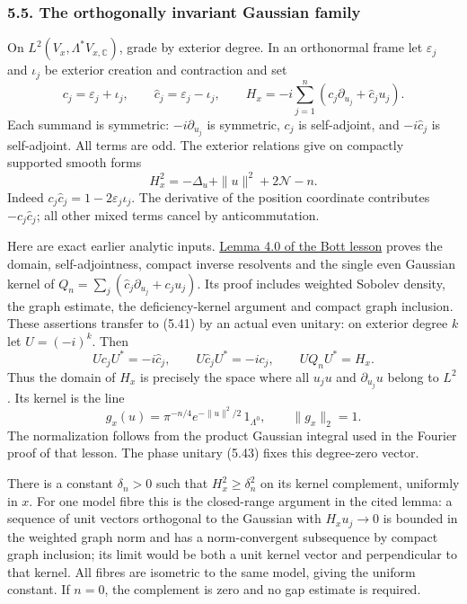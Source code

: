 \documentclass[
  11pt,
]{article}
\begin{document}
\subsubsection{5.5. The orthogonally invariant Gaussian
family}\label{the-orthogonally-invariant-gaussian-family}

On \(L^2(V_x,\Lambda^*V_{x,\mathbb C})\), grade by exterior degree. In
an orthonormal frame let \(\varepsilon_j\) and \(\iota_j\) be exterior
creation and contraction and set \[
c_j=\varepsilon_j+\iota_j,\qquad
\widehat c_j=\varepsilon_j-\iota_j,
\qquad
H_x=-i\sum_{j=1}^n(c_j\partial_{u_j}+\widehat c_j u_j).
\tag{5.41}
\] Each summand is symmetric: \(-i\partial_{u_j}\) is symmetric, \(c_j\)
is self-adjoint, and \(-i\widehat c_j\) is self-adjoint. All terms are
odd. The exterior relations give on compactly supported smooth forms \[
H_x^2=-\Delta_u+\|u\|^2+2\mathcal N-n.
\tag{5.42}
\] Indeed \(c_j\widehat c_j=1-2\varepsilon_j\iota_j\). The derivative of
the position coordinate contributes \(-c_j\widehat c_j\); all other
mixed terms cancel by anticommutation.

Here are exact earlier analytic inputs.
\href{KT-KK-12.html\#lemma-4-0-the-complete-oscillator-input}{Lemma 4.0
of the Bott lesson} proves the domain, self-adjointness, compact inverse
resolvents and the single even Gaussian kernel of
\(Q_n=\sum_j(\widehat c_j\partial_{u_j}+c_ju_j)\). Its proof includes
weighted Sobolev density, the graph estimate, the deficiency-kernel
argument and compact graph inclusion. These assertions transfer to
(5.41) by an actual even unitary: on exterior degree \(k\) let
\(U=(-i)^k\). Then \[
Uc_jU^*=-i\widehat c_j,\qquad
U\widehat c_jU^*=-ic_j,\qquad UQ_nU^*=H_x.
\tag{5.43}
\] Thus the domain of \(H_x\) is precisely the space where all \(u_ju\)
and \(\partial_{u_j}u\) belong to \(L^2\). Its kernel is the line \[
g_x(u)=\pi^{-n/4}e^{-\|u\|^2/2}\,1_{\Lambda^0},
\qquad \|g_x\|_2=1.
\tag{5.44}
\] The normalization follows from the product Gaussian integral used in
the Fourier proof of that lesson. The phase unitary (5.43) fixes this
degree-zero vector.

There is a constant \(\delta_n>0\) such that \(H_x^2\geq\delta_n^2\) on
its kernel complement, uniformly in \(x\). For one model fibre this is
the closed-range argument in the cited lemma: a sequence of unit vectors
orthogonal to the Gaussian with \(H_xu_j\to0\) is bounded in the
weighted graph norm and has a norm-convergent subsequence by compact
graph inclusion; its limit would be both a unit kernel vector and
perpendicular to that kernel. All fibres are isometric to the same
model, giving the uniform constant. If \(n=0\), the complement is zero
and no gap estimate is required.
\end{document}
